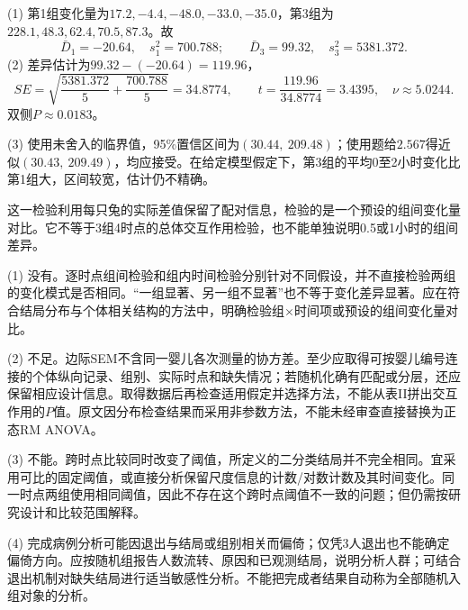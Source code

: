 (1) 第1组变化量为$17.2,-4.4,-48.0,-33.0,-35.0$，第3组为$228.1,48.3,62.4,70.5,87.3$。故
\[
\bar D_1=-20.64,\quad s_1^2=700.788;\qquad
\bar D_3=99.32,\quad s_3^2=5381.372.
\]
(2) 差异估计为$99.32-(-20.64)=119.96$，
\[
SE=\sqrt{\frac{5381.372}{5}+\frac{700.788}{5}}=34.8774,\qquad
t=\frac{119.96}{34.8774}=3.4395,\quad \nu\approx5.0244.
\]
双侧$P\approx0.0183$。

(3) 使用未舍入的临界值，95\%置信区间为$(30.44,\ 209.48)$；使用题给$2.567$得近似$(30.43,\ 209.49)$，均应接受。在给定模型假定下，第3组的平均0至2小时变化比第1组大，区间较宽，估计仍不精确。

这一检验利用每只兔的实际差值保留了配对信息，检验的是一个预设的组间变化量对比。它不等于3组4时点的总体交互作用检验，也不能单独说明0.5或1小时的组间差异。
\par\nobreak\smallskip{}

(1) 没有。逐时点组间检验和组内时间检验分别针对不同假设，并不直接检验两组的变化模式是否相同。“一组显著、另一组不显著”也不等于变化差异显著。应在符合结局分布与个体相关结构的方法中，明确检验组$\times$时间项或预设的组间变化量对比。

(2) 不足。边际SEM不含同一婴儿各次测量的协方差。至少应取得可按婴儿编号连接的个体纵向记录、组别、实际时点和缺失情况；若随机化确有匹配或分层，还应保留相应设计信息。取得数据后再检查适用假定并选择方法，不能从表II拼出交互作用的$P$值。原文因分布检查结果而采用非参数方法，不能未经审查直接替换为正态RM ANOVA。

(3) 不能。跨时点比较同时改变了阈值，所定义的二分类结局并不完全相同。宜采用可比的固定阈值，或直接分析保留尺度信息的计数/对数计数及其时间变化。同一时点两组使用相同阈值，因此不存在这个跨时点阈值不一致的问题；但仍需按研究设计和比较范围解释。

(4) 完成病例分析可能因退出与结局或组别相关而偏倚；仅凭3人退出也不能确定偏倚方向。应按随机组报告人数流转、原因和已观测结局，说明分析人群；可结合退出机制对缺失结局进行适当敏感性分析。不能把完成者结果自动称为全部随机入组对象的分析。
\par\nobreak\smallskip{}

